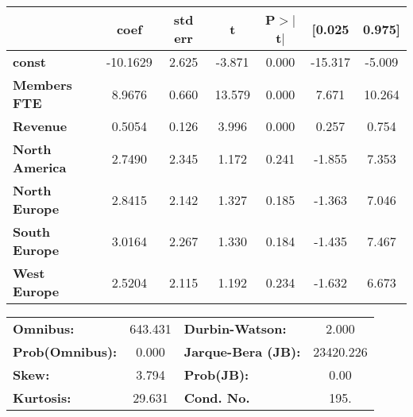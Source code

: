 \documentclass[ 11pt]{article}
\begin{document}
\begin{center}

\begin{tabular}{lcccccc}
                       & \textbf{coef} & \textbf{std err} & \textbf{t} & \textbf{P$> |$t$|$} & \textbf{[0.025} & \textbf{0.975]}  \\
\midrule
\textbf{const}         &     -10.1629  &        2.625     &    -3.871  &         0.000        &      -15.317    &       -5.009     \\
\textbf{Members FTE}   &       8.9676  &        0.660     &    13.579  &         0.000        &        7.671    &       10.264     \\
\textbf{Revenue}       &       0.5054  &        0.126     &     3.996  &         0.000        &        0.257    &        0.754     \\
\textbf{North America} &       2.7490  &        2.345     &     1.172  &         0.241        &       -1.855    &        7.353     \\
\textbf{North Europe}  &       2.8415  &        2.142     &     1.327  &         0.185        &       -1.363    &        7.046     \\
\textbf{South Europe}  &       3.0164  &        2.267     &     1.330  &         0.184        &       -1.435    &        7.467     \\
\textbf{West Europe}   &       2.5204  &        2.115     &     1.192  &         0.234        &       -1.632    &        6.673     \\
\bottomrule
\end{tabular}
\begin{tabular}{lclc}
\textbf{Omnibus:}       & 643.431 & \textbf{  Durbin-Watson:     } &     2.000  \\
\textbf{Prob(Omnibus):} &   0.000 & \textbf{  Jarque-Bera (JB):  } & 23420.226  \\
\textbf{Skew:}          &   3.794 & \textbf{  Prob(JB):          } &      0.00  \\
\textbf{Kurtosis:}      &  29.631 & \textbf{  Cond. No.          } &      195.  \\
\bottomrule
\end{tabular}
\end{center}
\end{document}
